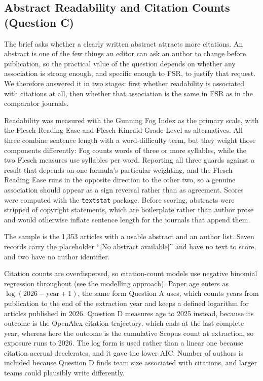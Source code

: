 \documentclass[11pt,a4paper]{article}
\begin{document}
\subsection{Abstract Readability and Citation Counts (Question C)}\label{abstract-readability-and-citation-counts-question-c}

The brief asks whether a clearly written abstract attracts more citations. An abstract is one of the few things an editor can ask an author to change before publication, so the practical value of the question depends on whether any association is strong enough, and specific enough to FSR, to justify that request. We therefore answered it in two stages: first whether readability is associated with citations at all, then whether that association is the same in FSR as in the comparator journals.

Readability was measured with the Gunning Fog Index as the primary scale, with the Flesch Reading Ease and Flesch-Kincaid Grade Level as alternatives. All three combine sentence length with a word-difficulty term, but they weight those components differently: Fog counts words of three or more syllables, while the two Flesch measures use syllables per word. Reporting all three guards against a result that depends on one formula's particular weighting, and the Flesch Reading Ease runs in the opposite direction to the other two, so a genuine association should appear as a sign reversal rather than as agreement. Scores were computed with the \texttt{textstat} package. Before scoring, abstracts were stripped of copyright statements, which are boilerplate rather than author prose and would otherwise inflate sentence length for the journals that append them.

The sample is the 1,353 articles with a usable abstract and an author list. Seven records carry the placeholder ``[No abstract available]'' and have no text to score, and two have no author identifier.

Citation counts are overdispersed, so citation-count models use negative binomial regression throughout (see the modelling approach). Paper age enters as \(\log(2026 - \text{year} + 1)\), the same form Question A uses, which counts years from publication to the end of the extraction year and keeps a defined logarithm for articles published in 2026. Question D measures age to 2025 instead, because its outcome is the OpenAlex citation trajectory, which ends at the last complete year, whereas here the outcome is the cumulative Scopus count at extraction, so exposure runs to 2026. The log form is used rather than a linear one because citation accrual decelerates, and it gave the lower AIC. Number of authors is included because Question D finds team size associated with citations, and larger teams could plausibly write differently.
\end{document}
